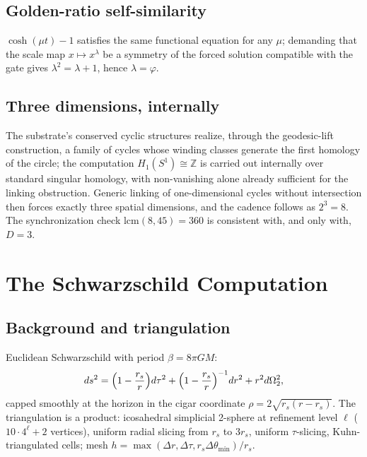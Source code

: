 \documentclass[11pt,letterpaper]{article}
\theoremstyle{definition}
\newcommand{\phiG}{\varphi}
\begin{document}
\subsection{Golden-ratio self-similarity}
$\cosh(\mu t)-1$ satisfies the same functional equation for any
$\mu$; demanding that the scale map $x\mapsto x^\lambda$ be a symmetry
of the forced solution compatible with the gate gives
$\lambda^2=\lambda+1$, hence $\lambda=\phiG$.

\subsection{Three dimensions, internally}
The substrate's conserved cyclic structures realize, through the
geodesic-lift construction, a family of cycles whose winding classes
generate the first homology of the circle; the computation
$H_1(S^1)\cong\mathbb{Z}$ is carried out internally over standard
singular homology, with non-vanishing alone already sufficient for the
linking obstruction.  Generic linking of one-dimensional cycles
without intersection then forces exactly three spatial dimensions, and
the cadence follows as $2^3=8$.  The synchronization check
$\mathrm{lcm}(8,45)=360$ is consistent with, and only with, $D=3$.

\section{The Schwarzschild Computation}
\label{app:schwarzschild}

\subsection{Background and triangulation}
Euclidean Schwarzschild with period $\beta=8\pi GM$:
\begin{equation}
ds^2=\Bigl(1-\frac{r_s}{r}\Bigr)d\tau^2
+\Bigl(1-\frac{r_s}{r}\Bigr)^{-1}dr^2+r^2d\Omega_2^2 ,
\end{equation}
capped smoothly at the horizon in the cigar coordinate
$\rho=2\sqrt{r_s(r-r_s)}$.  The triangulation is a product:
icosahedral simplicial 2-sphere at refinement level $\ell$
($10\cdot4^\ell+2$ vertices), uniform radial slicing from $r_s$ to
$3r_s$, uniform $\tau$-slicing, Kuhn-triangulated cells; mesh
$h=\max(\Delta r,\Delta\tau,r_s\Delta\theta_{\min})/r_s$.
\end{document}
